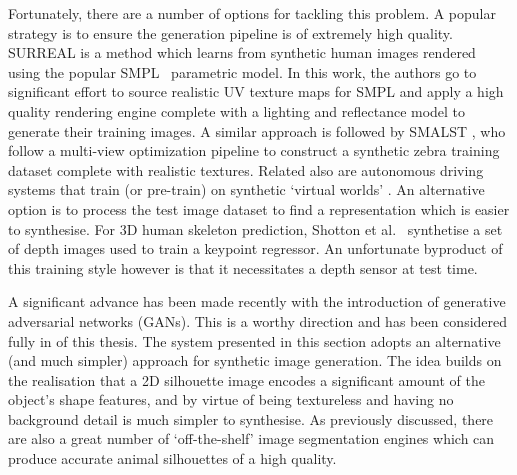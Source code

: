 Fortunately, there are a number of options for tackling this problem. A popular strategy is to ensure the generation pipeline is of extremely high quality. SURREAL is a method which learns from synthetic human images rendered using the popular SMPL~\cite{loper15smpl} parametric model. In this work, the authors go to significant effort to source realistic UV texture maps for SMPL and apply a high quality rendering engine complete with a lighting and reflectance model to generate their training images. A similar approach is followed by SMALST , who follow a multi-view optimization pipeline to construct a synthetic zebra training dataset complete with realistic textures. Related also are autonomous driving systems that train (or pre-train) on synthetic `virtual worlds' . An alternative option is to process the test image dataset to find a representation which is easier to synthesise. For 3D human skeleton prediction, Shotton et al.~\cite{shotton-kinect} synthetise a set of depth images used to train a keypoint regressor. An unfortunate byproduct of this training style however is that it necessitates a depth sensor at test time. 



A significant advance has been made recently with the introduction of generative adversarial networks (GANs). This is a worthy direction and has been considered fully in  of this thesis. The system presented in this section adopts an alternative (and much simpler) approach for synthetic image generation. The idea builds on the realisation that a 2D silhouette image encodes a significant amount of the object's shape features, and by virtue of being textureless and having no background detail is much simpler to synthesise. As previously discussed, there are also a great number of `off-the-shelf' image segmentation engines which can produce accurate animal silhouettes of a high quality. 


